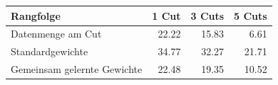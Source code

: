 \begin{tabular}{@{}lrrr@{}}
\toprule
Rangfolge & 1 Cut & 3 Cuts & 5 Cuts \\
\midrule
Datenmenge am Cut & 22.22 & 15.83 & 6.61 \\
Standardgewichte & 34.77 & 32.27 & 21.71 \\
Gemeinsam gelernte Gewichte & 22.48 & 19.35 & 10.52 \\
\bottomrule
\end{tabular}
